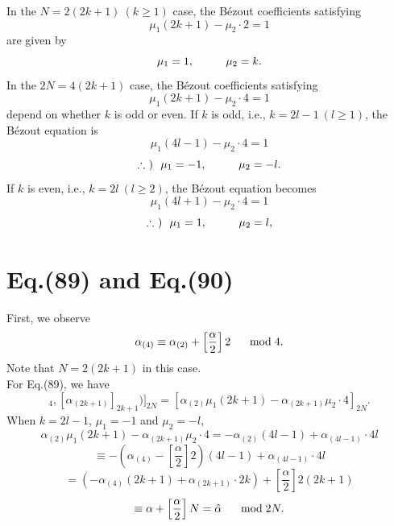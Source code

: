 \documentclass[12pt]{iopart}
\begin{document}
In the \(N=2(2k+1)\ (k\ge1)\) case, the B\'ezout coefficients satisfying
\begin{equation}
\mu_1(2k+1)-\mu_2\cdot2=1
\end{equation}
are given by
\begin{equation}
\mu_1=1,
\hspace{10mm}
\mu_2=k.
\end{equation}
In the \(2N=4(2k+1)\) case, the B\'ezout coefficients satisfying
\begin{equation}
\mu_1(2k+1)-\mu_2\cdot4=1
\end{equation}
depend on whether \(k\) is odd or even.
If \(k\) is odd, i.e., \(k=2l-1\ (l\ge1)\),
the B\'ezout equation is
\begin{equation}
\mu_1(4l-1)-\mu_2\cdot4=1
\end{equation}
\begin{equation}
\therefore\ )\ \ 
\mu_1=-1,
\hspace{10mm}
\mu_2=-l.
\end{equation}
If \(k\) is even, i.e., \(k=2l\ (l\ge2)\),
the B\'ezout equation becomes
\begin{equation}
\mu_1(4l+1)-\mu_2\cdot4=1
\end{equation}
\begin{equation}
\therefore\ )\ \ 
\mu_1=1,
\hspace{10mm}
\mu_2=l,
\end{equation}

\newpage

\section{Eq.(89) and Eq.(90)}

First, we observe
\begin{equation}
\alpha_{(4)}\equiv\alpha_{(2)}+\left[\frac\alpha2\right]2
\hspace{5mm}\bmod4.
\end{equation}
Note that \(N=2(2k+1)\) in this case.
\\

For Eq.(89), we have
\begin{equation}
[([\alpha_{(2)}]_4,[\alpha_{(2k+1)}]_{2k+1})]_{2N}
=
[\alpha_{(2)}\mu_1(2k+1)-\alpha_{(2k+1)}\mu_2\cdot4]_{2N}.
\end{equation}
When \(k=2l-1\), \(\mu_1=-1\) and \(\mu_2=-l\),
\[
\alpha_{(2)}\mu_1(2k+1)-\alpha_{(2k+1)}\mu_2\cdot4
=
-\alpha_{(2)}(4l-1)+\alpha_{(4l-1)}\cdot4l
\]
\[
\equiv
-(\alpha_{(4)}-\left[\frac\alpha2\right]2)(4l-1)+\alpha_{(4l-1)}\cdot4l
\]
\[
=
(-\alpha_{(4)}(2k+1)+\alpha_{(2k+1)}\cdot2k)
+\left[\frac\alpha2\right]2(2k+1)
\]
\begin{equation}
\equiv
\alpha+\left[\frac\alpha2\right]N
=
\hat\alpha
\hspace{5mm}\bmod2N.
\end{equation}
\end{document}
